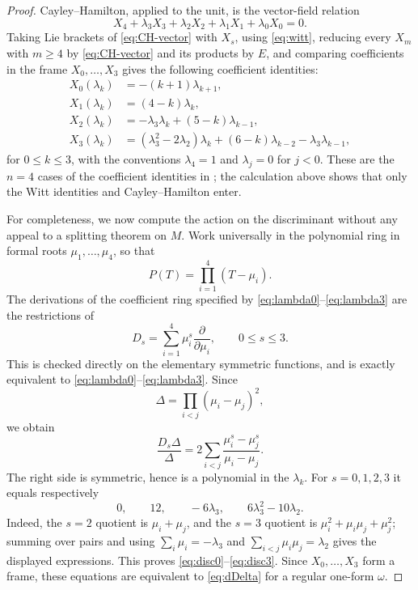 \begin{proof}
Cayley--Hamilton, applied to the unit, is the vector-field relation
\begin{equation}\label{eq:CH-vector}
 X_4+\lambda_3X_3+\lambda_2X_2+\lambda_1X_1+\lambda_0X_0=0.
\end{equation}
Taking Lie brackets of \eqref{eq:CH-vector} with $X_s$, using
\eqref{eq:witt}, reducing every $X_m$ with $m\ge4$ by
\eqref{eq:CH-vector} and its products by $E$, and comparing coefficients in
the frame $X_0,\dots,X_3$ gives the following coefficient identities:
\begin{align}
 X_0(\lambda_k)&=-(k+1)\lambda_{k+1},\label{eq:lambda0}\\
 X_1(\lambda_k)&=(4-k)\lambda_k,\label{eq:lambda1}\\
 X_2(\lambda_k)&=-\lambda_3\lambda_k+(5-k)\lambda_{k-1},\label{eq:lambda2}\\
 X_3(\lambda_k)&=(\lambda_3^2-2\lambda_2)\lambda_k
 +(6-k)\lambda_{k-2}-\lambda_3\lambda_{k-1},\label{eq:lambda3}
\end{align}
for $0\le k\le3$, with the conventions $\lambda_4=1$ and
$\lambda_j=0$ for $j<0$.  These are the $n=4$ cases of the coefficient
identities in \cite[(19),(20),(24),(25)]{DavidHertling}; the calculation above shows that
only the Witt identities and Cayley--Hamilton enter.

For completeness, we now compute the action on the discriminant without any
appeal to a splitting theorem on $M$.  Work universally in the polynomial
ring in formal roots $\mu_1,\dots,\mu_4$, so that
\[
  P(T)=\prod_{i=1}^4(T-\mu_i).
\]
The derivations of the coefficient ring specified by
\eqref{eq:lambda0}--\eqref{eq:lambda3} are the restrictions of
\[
  D_s=\sum_{i=1}^4\mu_i^s\frac{\partial}{\partial\mu_i},
  \qquad 0\le s\le3.
\]
This is checked directly on the elementary symmetric functions, and is
exactly equivalent to \eqref{eq:lambda0}--\eqref{eq:lambda3}.  Since
\[
  \Delta=\prod_{i<j}(\mu_i-\mu_j)^2,
\]
we obtain
\begin{equation}\label{eq:logdisc}
  \frac{D_s\Delta}{\Delta}
  =2\sum_{i<j}\frac{\mu_i^s-\mu_j^s}{\mu_i-\mu_j}.
\end{equation}
The right side is symmetric, hence is a polynomial in the $\lambda_k$.
For $s=0,1,2,3$ it equals respectively
\[
  0,\qquad 12,\qquad -6\lambda_3,
  \qquad 6\lambda_3^2-10\lambda_2.
\]
Indeed, the $s=2$ quotient is $\mu_i+\mu_j$, and the $s=3$ quotient is
$\mu_i^2+\mu_i\mu_j+\mu_j^2$; summing over pairs and using
$\sum_i\mu_i=-\lambda_3$ and
$\sum_{i<j}\mu_i\mu_j=\lambda_2$ gives the displayed expressions.  This
proves \eqref{eq:disc0}--\eqref{eq:disc3}.  Since
$X_0,\dots,X_3$ form a frame, these equations are equivalent to
\eqref{eq:dDelta} for a regular one-form $\omega$.


\end{proof}
